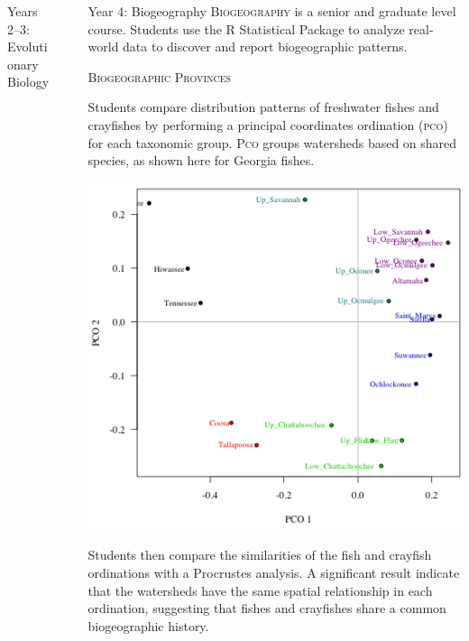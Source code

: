 \documentclass[final,hyperref={pdfpagelabels=false}]{beamer}
\newcommand{\whitespace}{\vspace{0.5\baselineskip}}
\newlength{\sepwid}
\newlength{\onecolwid}
\begin{document}
\begin{frame}[t]
\begin{columns}[t]
\begin{column}{\onecolwid}
\begin{block}{Years 2–3: Evolutionary Biology}
		\end{block}
	\end{column}

	\begin{column}{\sepwid}
	\end{column}

	\begin{column}{\onecolwid}
  	  	\begin{block}{Year 4: Biogeography}
			\textsc{Biogeography} is a senior and graduate level course. Students use the R Statistical Package \citep{R-Core-Team:2016aa} to analyze real-world data to discover and report biogeographic patterns.
			
       		\whitespace

			\textsc{Biogeographic Provinces} 

			Students compare distribution patterns of freshwater fishes and crayfishes by performing a principal coordinates ordination (\textsc{pco}) for each taxonomic group. \textsc{Pco} groups watersheds based on shared species, as shown here for Georgia fishes.
		
			\whitespace

			\includegraphics[width=\textwidth]{fishes_pco}

			
			Students then compare the similarities of the fish and crayfish ordinations with a Procrustes analysis. A significant result indicate that the watersheds have the same spatial relationship in each ordination, suggesting that fishes and crayfishes share a common biogeographic history. 
			

\end{block}
\end{column}
\end{columns}
\end{frame}
\end{document}
